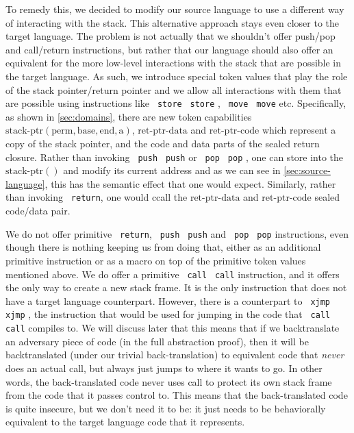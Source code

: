 \documentclass[a4paper]{article}
\newcommand{\sourcecolor}[1]{\color{blue}}
\newcommand{\src}[1]{{\sourcecolor{} #1}}
\newcommand{\targetcolor}[1]{\color{black}}
\newcommand{\trg}[1]{{\targetcolor{} #1}}
\newcommand{\zinstr}[1]{\texttt{#1}}
\newcommand{\oneinstr}[2]{
  \ifthenelse{\equal{#2}{}}
  {\zinstr{#1}}
  {\zinstr{#1} \; #2}
}
\newcommand{\twoinstr}[3]{
  \ifthenelse{\equal{#2#3}{}}
  {\zinstr{#1}}
  {\zinstr{#1} \; #2 \; #3}
}
\newcommand{\sreturn}{\zinstr{\src{return}}}
\newcommand{\spush}[1]{\oneinstr{\src{push}}{#1}}
\newcommand{\spop}[1]{\oneinstr{\src{pop}}{#1}}
\newcommand{\smove}[2]{\twoinstr{\src{move}}{#1}{#2}}
\newcommand{\sstore}[2]{\twoinstr{\src{store}}{#1}{#2}}
\newcommand{\scall}[2]{\twoinstr{\src{call}}{#1}{#2}}
\newcommand{\sxjmp}[2]{\twoinstr{\trg{xjmp}}{#1}{#2}}
\newcommand{\shareddom}[1]{\mathrm{#1}}
\newcommand{\permbnf}{\shareddom{perm}}
\newcommand{\addrbnf}{\shareddom{a}}
\newcommand{\basebnf}{\shareddom{base}}
\newcommand{\aendbnf}{\shareddom{end}}
\newcommand{\stkptr}[1]{\mathrm{stack\text{-}ptr}(#1)}
\newcommand{\retptrd}{\mathrm{ret\text{-}ptr\text{-}data}}
\newcommand{\retptrc}{\mathrm{ret\text{-}ptr\text{-}code}}
\begin{document}
To remedy this, we decided to modify our source language to use a different way of interacting with the stack.
This alternative approach stays even closer to the target language.
The problem is not actually that we shouldn't offer push/pop and call/return instructions, but rather that our language should also offer an equivalent for the more low-level interactions with the stack that are possible in the target language.
As such, we introduce special token values that play the role of the stack pointer/return pointer and we allow all interactions with them that are possible using instructions like \sstore{}{}, \smove{}{} etc.
Specifically, as shown in \cref{sec:domains}, there are new token capabilities $\stkptr{\permbnf,\basebnf,\aendbnf,\addrbnf}$, $\retptrd$ and $\retptrc$ which represent a copy of the stack pointer, and the code and data parts of the sealed return closure.
Rather than invoking \spush{} or \spop{}, one can store into the $\stkptr{}$ and modify its current address and as we can see in \cref{sec:source-language}, this has the semantic effect that one would expect.
Similarly, rather than invoking \sreturn{}, one would ccall the $\retptrd$ and $\retptrc$ sealed code/data pair.

We do not offer primitive \sreturn{}, \spush{} and \spop{} instructions, even though there is nothing keeping us from doing that, either as an additional primitive instruction or as a macro on top of the primitive token values mentioned above.
We do offer a primitive \scall{}{} instruction, and it offers the only way to create a new stack frame.
It is the only instruction that does not have a target language counterpart.
However, there is a counterpart to \sxjmp{}{}, the instruction that would be used for jumping in the code that \scall{}{} compiles to.
We will discuss later that this means that if we backtranslate an adversary piece of code (in the full abstraction proof), then it will be backtranslated (under our trivial back-translation) to equivalent code that \emph{never} does an actual call, but always just jumps to where it wants to go.
In other words, the back-translated code never uses call to protect its own stack frame from the code that it passes control to.
This means that the back-translated code is quite insecure, but we don't need it to be: it just needs to be behaviorally equivalent to the target language code that it represents.
\end{document}
